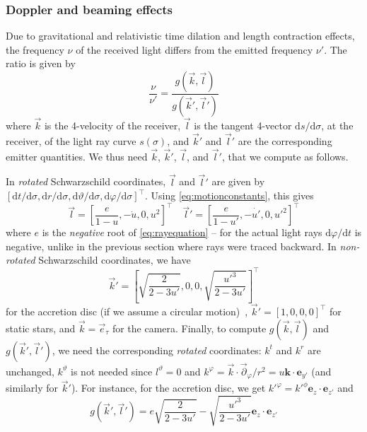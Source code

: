\documentclass{document}
\newcommand{\diff}{\mathrm d}
\begin{document}
\subsubsection{Doppler and beaming effects}

Due to gravitational and relativistic time dilation and length contraction 
effects, the frequency $\nu$ of the received light differs from the emitted 
frequency $\nu'$. The ratio is given by~\cite{Philipp2017}
\begin{equation}
\frac{\nu}{\nu'} = \frac{g(\vec{k}, \vec{l})}{g(\vec{k}', \vec{l}')}
\label{eq:Doppler}
\end{equation}
where $\vec{k}$ is the 4-velocity of the receiver, $\vec{l}$ is the tangent 
4-vector $\diff s / \diff 
\sigma$,  at the receiver, of the light ray curve $s(\sigma)$, and  
$\vec{k}'$ and $\vec{l}'$ are the corresponding emitter quantities. We thus 
need $\vec{k}$, $\vec{k}'$, $\vec{l}$, and $\vec{l}'$, that we compute as 
follows.

In {\em rotated} Schwarzschild coordinates, $\vec{l}$ and $\vec{l}'$ are 
given by $[\diff t / \diff \sigma, \diff r / \diff \sigma, \diff \vartheta / 
\diff \sigma, \diff\varphi / \diff \sigma]^{\top}$. Using 
\eqref{eq:motionconstants}, this gives
\begin{equation}
\vec{l} = \left[ \frac{e}{1 - u}, -\dot{u}, 0, u^2 \right]^{\top} \quad
\vec{l}' = \left[\frac{e}{1 - u'}, -\dot{u'}, 0, u'^2 \right]^{\top}
\end{equation}
where $e$ is the {\em negative} root of \eqref{eq:rayequation} -- for the  
actual light rays $\diff \varphi / \diff t$ is negative, unlike in the previous 
section where rays were traced backward. In {\em non-rotated} Schwarzschild 
coordinates, we have
\begin{equation}
\vec{k}' = \left[
    \sqrt{\frac{2}{2 - 3u'}}, 
    0,
    0,
    \sqrt{\frac{u'^3}{2 - 3u'}} \right]^{\top}
\label{eq:k_prime}
\end{equation}
for the accretion disc (if we assume a circular motion)~\cite{Philipp2017}, 
$\vec{k}' = [1, 0, 0, 0]^{\top}$ for static stars, and $\vec{k} = 
\vec{e}_{\tau}$ for the camera. Finally, to compute $g(\vec{k}, \vec{l})$ and 
$g(\vec{k}', \vec{l}')$, we need the corresponding {\em rotated} coordinates: 
$k^t$ and $k^r$ are unchanged, $k^\vartheta$ is not needed since $l^\vartheta = 
0$ and $k^\varphi = \vec{k} \cdot \vec{\partial}_\varphi/r^2 = u\mathbf{k} 
\cdot \mathbf{e}_{y'}$ (and similarly for $\vec{k}'$). For instance, for the 
accretion disc, we get $k'^\varphi = k'^\phi \mathbf{e}_z \cdot 
\mathbf{e}_{z'}$ and
\begin{equation}
g(\vec{k}', \vec{l}') = e \sqrt{\frac{2}{2 - 3u'}} - 
    \sqrt{\frac{u'^3}{2 - 3u'}} {\mathbf e}_z \cdot {\mathbf e}_{z'}
\end{equation}
\end{document}
